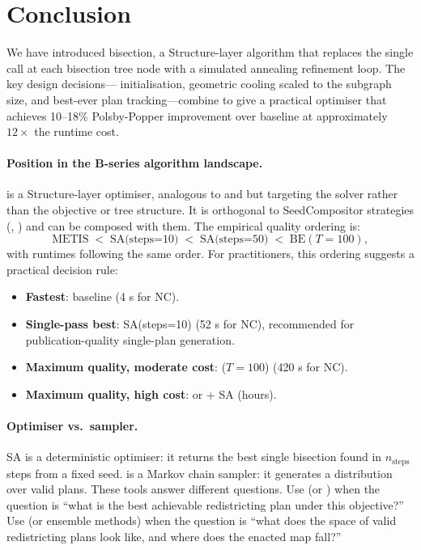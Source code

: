 \section{Conclusion}
\label{sec:conclusion}

We have introduced \sa{} bisection, a Structure-layer algorithm that replaces
the single \metis{} call at each bisection tree node with a simulated
annealing refinement loop.
The key design decisions---\metis{} initialisation, geometric cooling scaled
to the subgraph size, and best-ever plan tracking---combine to give a
practical optimiser that achieves 10--18\% Polsby-Popper improvement over
baseline \metis{} at approximately $12\times$ the runtime cost.

\paragraph{Position in the B-series algorithm landscape.}
\sa{} is a Structure-layer optimiser, analogous to \geosec{} and \areasec{}
but targeting the solver rather than the objective or tree structure.
It is orthogonal to SeedCompositor strategies (\cs{}, \be{}) and can be
composed with them.
The empirical quality ordering is:
\[
  \text{METIS} \;<\; \text{SA(steps=10)} \;<\; \text{SA(steps=50)}
  \;<\; \text{BE}(T=100),
\]
with runtimes following the same order.
For practitioners, this ordering suggests a practical decision rule:
\begin{itemize}
\item \textbf{Fastest}: baseline \metis{} (4 s for NC).
\item \textbf{Single-pass best}: SA(steps=10) (52 s for NC), recommended for
  publication-quality single-plan generation.
\item \textbf{Maximum quality, moderate cost}: \be{}($T=100$) (420 s for NC).
\item \textbf{Maximum quality, high cost}: \cs{} or \be{} + SA (hours).
\end{itemize}

\paragraph{Optimiser vs.\ sampler.}
SA is a deterministic optimiser: it returns the best single bisection found
in $n_{\mathrm{steps}}$ steps from a fixed seed.
\recom{} is a Markov chain sampler: it generates a distribution over valid
plans.
These tools answer different questions.
Use \sa{} (or \be{}) when the question is ``what is the best achievable
redistricting plan under this objective?''
Use \recom{} (or ensemble methods) when the question is ``what does the
space of valid redistricting plans look like, and where does the enacted
map fall?''

